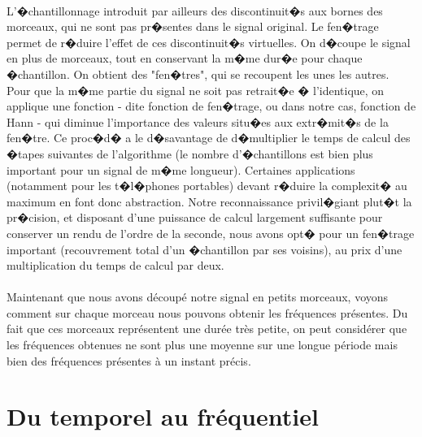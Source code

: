 \paragraph{}
	L'�chantillonnage introduit par ailleurs des discontinuit�s aux bornes des morceaux, qui ne sont pas pr�sentes 
	dans le signal original. Le fen�trage permet de r�duire l'effet de ces discontinuit�s virtuelles. 
	On d�coupe le signal en plus de morceaux, tout en conservant la m�me dur�e pour chaque �chantillon. 
	On obtient des "fen�tres", qui se recoupent les unes les autres. 
	Pour que la m�me partie du signal ne soit pas retrait�e � l'identique, 
	on applique une fonction - dite fonction de fen�trage, ou dans notre cas, fonction de Hann - 
	qui diminue l'importance des valeurs situ�es aux extr�mit�s de la fen�tre. 
	Ce proc�d� a le d�savantage de d�multiplier le temps de calcul des �tapes suivantes de 
	l'algorithme (le nombre d'�chantillons est bien plus important pour un signal de m�me longueur). 
	Certaines applications (notamment pour les t�l�phones portables) devant r�duire la complexit� au 
	maximum en font donc abstraction. Notre reconnaissance privil�giant plut�t la pr�cision, et 
	disposant d'une puissance de calcul largement suffisante pour conserver un rendu de l'ordre de 
	la seconde, nous avons opt� pour un fen�trage important (recouvrement total d'un �chantillon par ses voisins), 
	au prix d'une multiplication du temps de calcul par deux.
\paragraph{}
	Maintenant que nous avons découpé notre signal en petits morceaux, voyons comment sur chaque morceau nous 
	pouvons obtenir les fréquences présentes. Du fait que ces morceaux représentent une durée très petite, on peut
	considérer que les fréquences obtenues ne sont plus une moyenne sur une longue période mais bien des fréquences 
	présentes à un instant précis.

        	\section{Du temporel au fréquentiel}
